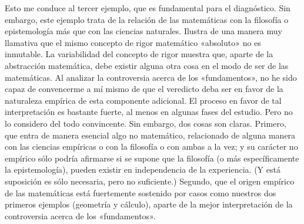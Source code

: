 \documentclass[a4paper, 12pt]{article}
\begin{document}
Esto me conduce al tercer ejemplo, que es fundamental para el diagnóstico. Sin embargo, este ejemplo trata de la relación de las matemáticas con la filosofía o epistemología más que con las ciencias naturales. Ilustra de una manera muy llamativa que el mismo concepto de rigor matemático «absoluto» no es inmutable. La variabilidad del concepto de rigor muestra que, aparte de la abstracción matemática, debe existir alguna otra cosa en el modo de ser de las matemáticas. Al analizar la controversia acerca de los «fundamentos», no he sido capaz de convencerme a mí mismo de que el veredicto deba ser en favor de la naturaleza empírica de esta componente adicional. El proceso en favor de tal interpretación es bastante fuerte, al menos en algunas fases del estudio. Pero no lo considero del todo convincente. Sin embargo, dos cosas son claras. Primero, que entra de manera esencial algo no matemático, relacionado de alguna manera con las ciencias empíricas o con la filosofía o con ambas a la vez; y su carácter no empírico sólo podría afirmarse si se supone que la filosofía (o más específicamente la epistemología), pueden existir en independencia de la experiencia. (Y está suposición es sólo necesaria, pero no suficiente.) Segundo, que el origen empírico de las matemáticas está fuertemente sostenido por casos como nuestros dos primeros ejemplos (geometría y cálculo), aparte de la mejor interpretación de la controversia acerca de los «fundamentos».
\end{document}
